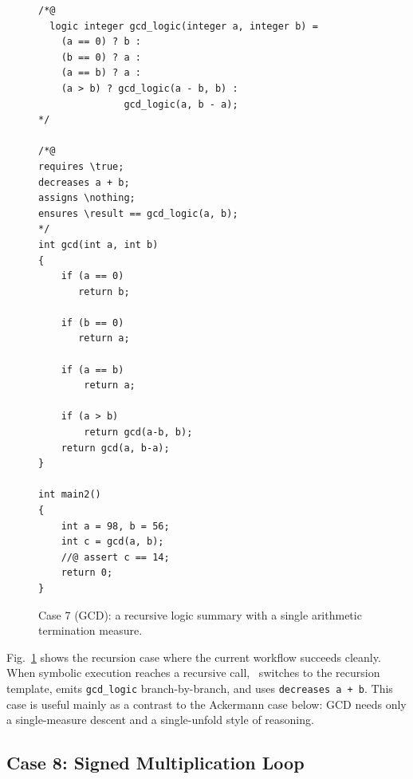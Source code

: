 \begin{figure}[!b]
    \centering
    \begin{tcolorbox}[casebox, title={Case 7: recursive GCD summary}]
\begin{lstlisting}[style=casecompactinnerstyle]
/*@ 
  logic integer gcd_logic(integer a, integer b) =
    (a == 0) ? b :
    (b == 0) ? a :
    (a == b) ? a :
    (a > b) ? gcd_logic(a - b, b) :
               gcd_logic(a, b - a);
*/

/*@
requires \true;
decreases a + b;
assigns \nothing;
ensures \result == gcd_logic(a, b);
*/
int gcd(int a, int b) 
{
    if (a == 0)
       return b;

    if (b == 0)
       return a;

    if (a == b)
        return a;

    if (a > b)
        return gcd(a-b, b);
    return gcd(a, b-a);
}

int main2()
{
    int a = 98, b = 56;
    int c = gcd(a, b);
    //@ assert c == 14;
    return 0;
}
\end{lstlisting}
    \end{tcolorbox}
    \caption{Case 7 (GCD): a recursive logic summary with a single arithmetic termination measure.}
    \label{fig:case5}
\end{figure}

Fig.~\ref{fig:case5} shows the recursion case where the current workflow succeeds cleanly. When symbolic execution reaches a recursive call, \toolname\ switches to the recursion template, emits \texttt{gcd\_logic} branch-by-branch, and uses \texttt{decreases a + b}. This case is useful mainly as a contrast to the Ackermann case below: GCD needs only a single-measure descent and a single-unfold style of reasoning.

\subsection{Case 8: Signed Multiplication Loop}
\label{app:case-mulloop}

